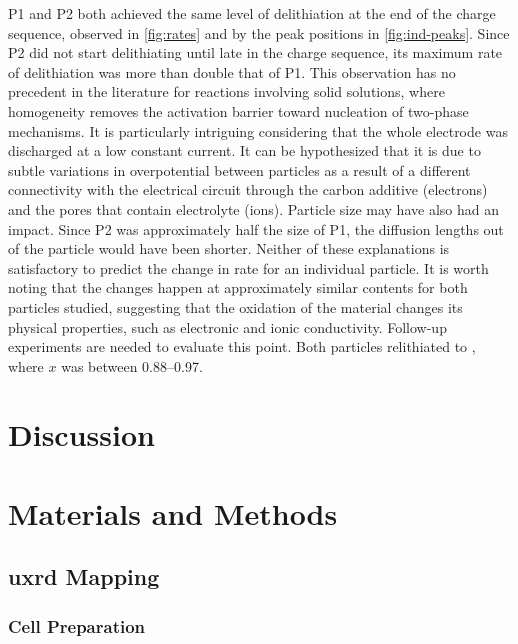 \documentclass{article}
\begin{document}
P1 and P2 both achieved the same level of delithiation at the end of
the charge sequence, observed in \ref{fig:rates} and by the peak
positions in \ref{fig:ind-peaks}. Since P2 did not start delithiating
until late in the charge sequence, its maximum rate of delithiation
was more than double that of P1. This observation has no precedent in
the literature for reactions involving solid solutions, where
homogeneity removes the activation barrier toward nucleation of
two-phase mechanisms. It is particularly intriguing considering that
the whole electrode was discharged at a low constant current. It can
be hypothesized that it is due to subtle variations in overpotential
between particles as a result of a different connectivity with the
electrical circuit through the carbon additive (electrons) and the
pores that contain electrolyte (ions). Particle size may have also had
an impact. Since P2 was approximately half the size of P1, the 
diffusion lengths out of the particle would have been shorter. Neither
of these explanations is satisfactory to predict the change in rate
for an individual particle. It is worth noting that the changes happen
at approximately similar  contents for both particles studied,
suggesting that the oxidation of the material changes its physical
properties, such as electronic and ionic conductivity. Follow-up
experiments are needed to evaluate this point. Both particles
relithiated to , where $x$ was between \numrange{0.88}{0.97}.


\section{Discussion}

\section{Materials and Methods}

\subsection{\gls{uxrd} Mapping}

\subsubsection{Cell Preparation}
\end{document}
